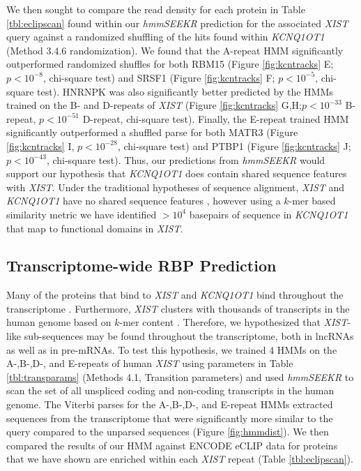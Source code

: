 We then sought to compare the read density for each protein in Table \ref{tbl:eclipscan} found within our \emph{hmmSEEKR} prediction for the associated \emph{XIST} query against a randomized shuffling of the hits found within \emph{KCNQ1OT1} (Method 3.4.6 randomization). We found that the A-repeat HMM significantly outperformed randomized shuffles for both RBM15 (Figure \ref{fig:kcntracks} E; $p< 10^{-8}$, chi-square test) and SRSF1 (Figure \ref{fig:kcntracks} F; $p< 10^{-5}$, chi-square test). HNRNPK was also significantly better predicted by the HMMs trained on the B- and D-repeats of \emph{XIST} (Figure \ref{fig:kcntracks} G,H;$p<10^{-33}$ B-repeat, $p<10^{-51}$ D-repeat, chi-square test). Finally, the E-repeat trained HMM significantly outperformed a shuffled parse for both MATR3 (Figure \ref{fig:kcntracks} I, $p<10^{-28}$, chi-square test) and PTBP1 (Figure \ref{fig:kcntracks} J; $p<10^{-43}$, chi-square test). Thus, our predictions from \textit{hmmSEEKR} would support our hypothesis that \textit{KCNQ1OT1} does contain shared sequence features with \textit{XIST}. Under the traditional hypotheses of sequence alignment, \textit{XIST} and \textit{KCNQ1OT1} have no shared sequence features \cite{Altschul1990BasicTool,Wheeler2013Nhmmer:HMMs,Rice2000EMBOSS:Suite}, however using a $k$-mer based similarity metric we have identified $>10^4$ basepairs of sequence in \textit{KCNQ1OT1} that map to functional domains in \textit{XIST}. 

\clearpage



\subsection{Transcriptome-wide RBP Prediction}
Many of the proteins that bind to \emph{XIST} and \emph{KCNQ1OT1} bind throughout the transcriptome \cite{VanNostrand2016RobusteCLIP}. Furthermore, \emph{XIST} clusters with thousands of transcripts in the human genome based on $k$-mer content \cite{Kirk2018FunctionalContent}. Therefore, we hypothesized that \emph{XIST}-like sub-sequences may be found throughout the transcriptome, both in lncRNAs as well as in pre-mRNAs. To test this hypothesis, we trained 4 HMMs on the A-,B-,D-, and E-repeats of human \emph{XIST} using parameters in Table \ref{tbl:transparams} (Methods 4.1, Transition parameters) and used \emph{hmmSEEKR} to scan the set of all unspliced coding and non-coding transcripts in the human genome. The Viterbi parses for the A-,B-,D-, and E-repeat HMMs extracted sequences from the transcriptome that were significantly more similar to the query compared to the unparsed sequences (Figure \ref{fig:hmmdist}).  We then compared the results of our HMM against ENCODE eCLIP data for proteins that we have shown are enriched within each \emph{XIST} repeat (Table \ref{tbl:eclipscan}). 

